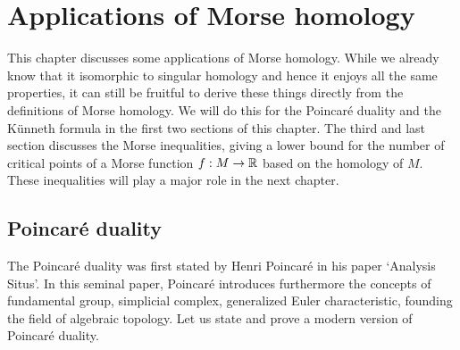 \chapter{Applications of Morse homology}
\label{chap:app-morse-homology}

This chapter discusses some applications of Morse homology.
While we already know that it isomorphic to singular homology and hence it enjoys all the same properties, it can still be fruitful to derive these things directly from the definitions of Morse homology.
We will do this for the Poincaré duality and the Künneth formula in the first two sections of this chapter.
The third and last section discusses the Morse inequalities, giving a lower bound for the number of critical points of a Morse function $f: M \to  \mathbb{R}$ based on the homology of $M$.
These inequalities will play a major role in the next chapter.

\section{Poincaré duality}
The Poincaré duality was first stated by Henri Poincaré in his paper `Analysis Situs'.
In this seminal paper, Poincaré introduces furthermore the concepts of fundamental group, simplicial complex, generalized Euler characteristic, founding the field of algebraic topology. Let us state and prove a modern version of Poincaré duality.

